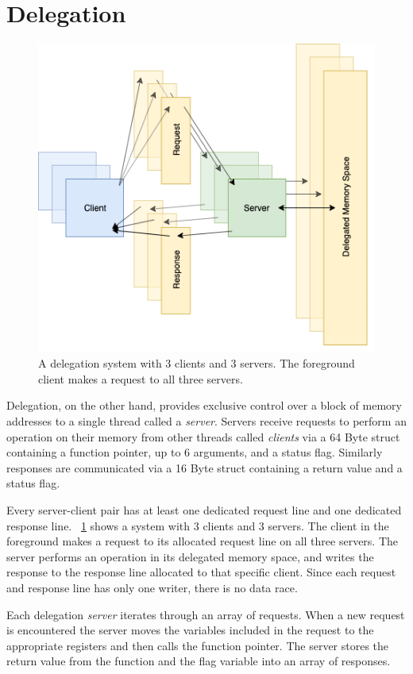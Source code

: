\documentclass{uicthesi}
\begin{document}
\section{Delegation}
\begin{figure}[ht!]
\centering
\includegraphics[width=0.9\columnwidth]{FIG/general_delegation.png}
\caption{A delegation system with 3 clients and 3 servers. The foreground client makes a request to all three servers. }
\label{fig:general_delegation}
\end{figure}
Delegation, on the other hand, provides exclusive control over a block of memory addresses to a single thread called a \textit{server}. Servers receive requests to perform an operation on their memory from other threads called \textit{clients} via a 64 Byte struct containing a function pointer, up to 6 arguments, and a status flag. Similarly responses are communicated via a 16 Byte struct containing a return value and a status flag.  

Every server-client pair has at least one dedicated request line and one dedicated response line. ~\ref{fig:general_delegation} shows a system with 3 clients and 3 servers. The client in the foreground makes a request to its allocated request line on all three servers. The server performs an operation in its delegated memory space, and writes the response to the response line allocated to that specific client. Since each request and response line has only one writer, there is no data race. 

Each delegation \textit{server} iterates through an array of requests. When a new request is encountered the server moves the variables included in the request to the appropriate registers and then calls the function pointer. The server stores the return value from the function and the flag variable into an array of responses. 
\end{document}
